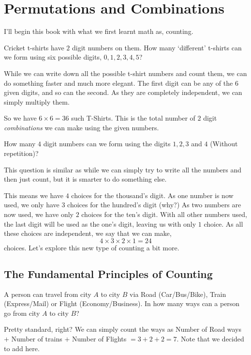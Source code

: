 \chapter{Permutations and Combinations} 

I'll begin this book with what we first learnt math as, counting.

\begin{example}
Cricket t-shirts have \(2\) digit numbers on them. How many `different' t-shirts can we form 
using six possible digits, \(0, 1, 2, 3, 4, 5\)? 
\end{example}

While we can write down all the possible t-shirt numbers and count them, we can do something 
faster and much more elegant. The first digit can be any of the \(6\) given digits, 
and so can the second. As they are completely independent, we can simply multiply them.

So we have $6 \times 6=36$ such T-Shirts. This is the total number of \(2\) digit \emph{combinations}
we can make using the given numbers.

\begin{example}
How many \(4\) digit numbers can we form using the digits \(1, 2, 3\) and \(4\) 
(Without repetition)?
\end{example}

This question is similar as while we can simply try to write all the numbers and then just count, 
but it is smarter to do something else.

This means we have \(4\) choices for the thousand's digit. As one number is now used, 
we only have \(3\) choices for the hundred's digit (why?) 
As two numbers are now used, we have only \(2\) choices for the ten's digit. 
With all other numbers used, the last digit will be used as the one's digit, leaving us with only 
\(1\) choice. As all these choices are independent, we say that we can make,
\[
    4 \times 3 \times 2 \times 1 = 24
\]choices.
Let's explore this new type of counting a bit more.

\section{The Fundamental Principles of Counting}

\begin{example}
A person can travel from city \(A\) to city \(B\) via Road (Car/Bus/Bike), Train 
(Express/Mail) or Flight (Economy/Business). 
In how many ways can a person go from city \(A\) to city \(B\)?
\end{example}
Pretty standard, right? We can simply count the ways as {Number of Road ways} \(+\)
{Number of trains} \(+\) {Number of Flights} \( = 3 + 2 + 2 = 7\). Note that we decided to 
add here.

